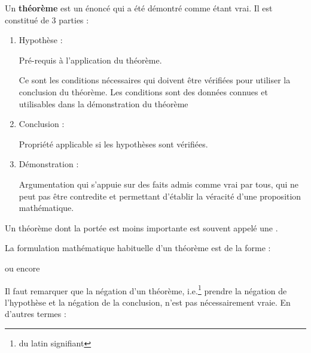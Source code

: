 \bigskip
\begin{definition}
Un \textbf{théorème} est un énoncé qui a été démontré comme étant vrai. Il est constitué de 3 parties :

\begin{enumerate}[label=\arabic*),itemsep=2mm]
\item Hypothèse : \hspace{8mm}\begin{minipage}[t]{0.7\textwidth}
Pré-requis à l'application du théorème.

\smallskip
\small
Ce sont les conditions nécessaires qui doivent être vérifiées pour utiliser la conclusion du théorème. Les conditions sont des données connues et utilisables dans la démonstration du théorème
\end{minipage}
\item Conclusion :\hspace{7mm} \begin{minipage}[t]{0.7\textwidth}
Propriété applicable si les hypothèses sont vérifiées.
\end{minipage}
\item Démonstration :\hspace{1mm} \begin{minipage}[t]{0.7\textwidth}
Argumentation qui s'appuie sur des faits admis comme vrai par tous, qui ne peut pas être contredite et permettant d'établir la véracité d'une proposition mathématique.
\end{minipage}
\end{enumerate}

\bigskip
Un théorème dont la portée est moins importante est souvent appelé une .
\end{definition}


\clearpage
La formulation mathématique habituelle d'un théorème  est de la forme :
\begin{center}
\textsl{}

\medskip
ou encore

\medskip
\textsl{}
\end{center}

Il faut remarquer que la négation d'un théorème, i.e.\footnote{du latin  signifiant } prendre la négation de l'hypothèse et la négation de la conclusion, n'est pas nécessairement vraie. En d'autres termes :


